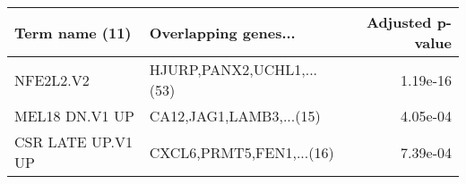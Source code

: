 \begin{tabular}{llr}
\toprule
   Term name (11) &      Overlapping genes... &  Adjusted p-value \\
\midrule
        NFE2L2.V2 & HJURP,PANX2,UCHL1,...(53) &          1.19e-16 \\
   MEL18 DN.V1 UP &   CA12,JAG1,LAMB3,...(15) &          4.05e-04 \\
CSR LATE UP.V1 UP &  CXCL6,PRMT5,FEN1,...(16) &          7.39e-04 \\
\bottomrule
\end{tabular}

